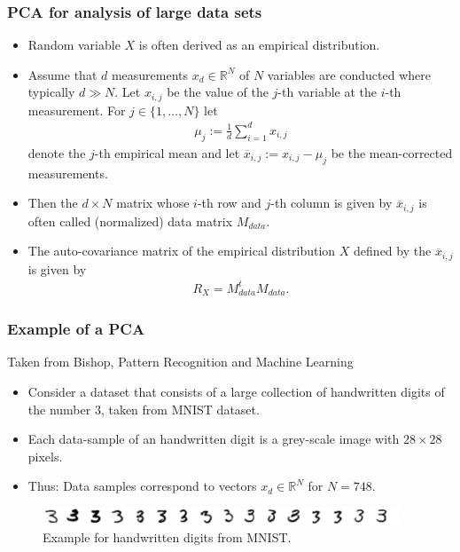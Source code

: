 \begin{frame}\frametitle{PCA for analysis of large data sets}
\begin{itemize}
\item Random variable $X$ is often derived as an empirical distribution.
\item Assume that $d$ measurements $x_d\in\mathbb{R}^N$ of $N$ variables are conducted where typically $d\gg N$. 
Let $x_{i,j}$ be the value of the $j$-th variable at the $i$-th measurement. 
For $j\in\{1,\dots,N\}$ let 
\begin{align*}
\mu_j:=\frac{1}{d}\sum_{i=1}^dx_{i,j}
\end{align*}
denote the $j$-th empirical mean and let $\overline{x}_{i,j}:=x_{i,j}-\mu_j$ be the 
mean-corrected measurements. 
\item Then the $d\times N$ matrix whose 
$i$-th row and $j$-th column is given by $\overline{x}_{i,j}$ is often called (normalized) data matrix $M_{data}$.
\item The auto-covariance matrix of the empirical distribution $X$ defined by the $\overline{x}_{i,j}$ is 
given by 
\begin{align*}
R_X=M_{data}^tM_{data}. 
\end{align*}
\end{itemize}
\end{frame}

\begin{frame}\frametitle{Example of a PCA}
Taken from Bishop, Pattern Recognition and Machine Learning 
\begin{itemize}
\item Consider a dataset that consists of a large collection of handwritten digits of the number $3$, taken from MNIST dataset.
\item Each data-sample of an handwritten digit is a grey-scale image with $28\times 28$ pixels. 
\item Thus: Data samples correspond to vectors $x_d\in \mathbb {R}^N$ for $N=748$. 
\end{itemize}
\begin{figure}
\centering
\includegraphics[width=0.95\textwidth]{TrCoding/number_3_MNIST.png}
\captionsetup{labelformat=empty}
\caption{Example for handwritten digits from MNIST.}
\end{figure}
\end{frame}

